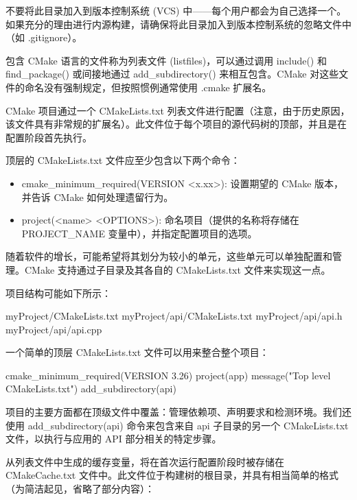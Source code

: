 不要将此目录加入到版本控制系统 (VCS) 中——每个用户都会为自己选择一个。如果充分的理由进行内源构建，请确保将此目录加入到版本控制系统的忽略文件中（如 .gitignore）。


包含 CMake 语言的文件称为列表文件 (listfiles)，可以通过调用 include() 和 find\_package() 或间接地通过 add\_subdirectory() 来相互包含。CMake 对这些文件的命名没有强制规定，但按照惯例通常使用 .cmake 扩展名。


CMake 项目通过一个 CMakeLists.txt 列表文件进行配置（注意，由于历史原因，该文件具有非常规的扩展名）。此文件位于每个项目的源代码树的顶部，并且是在配置阶段首先执行。

顶层的 CMakeLists.txt 文件应至少包含以下两个命令：

\begin{itemize}
\item
cmake\_minimum\_required(VERSION <x.xx>): 设置期望的 CMake 版本，并告诉 CMake 如何处理遗留行为。

\item
project(<name> <OPTIONS>): 命名项目（提供的名称将存储在 PROJECT\_NAME 变量中），并指定配置项目的选项。
\end{itemize}

随着软件的增长，可能希望将其划分为较小的单元，这些单元可以单独配置和管理。CMake 支持通过子目录及其各自的 CMakeLists.txt 文件来实现这一点。

项目结构可能如下所示：

\begin{shell}
myProject/CMakeLists.txt
myProject/api/CMakeLists.txt
myProject/api/api.h
myProject/api/api.cpp
\end{shell}

一个简单的顶层 CMakeLists.txt 文件可以用来整合整个项目：

\begin{cmake}
cmake_minimum_required(VERSION 3.26)
project(app)
message("Top level CMakeLists.txt")
add_subdirectory(api)
\end{cmake}

项目的主要方面都在顶级文件中覆盖：管理依赖项、声明要求和检测环境。我们还使用 add\_subdirectory(api) 命令来包含来自 api 子目录的另一个 CMakeLists.txt 文件，以执行与应用的 API 部分相关的特定步骤。


从列表文件中生成的缓存变量，将在首次运行配置阶段时被存储在 CMakeCache.txt 文件中。此文件位于构建树的根目录，并具有相当简单的格式（为简洁起见，省略了部分内容）：

